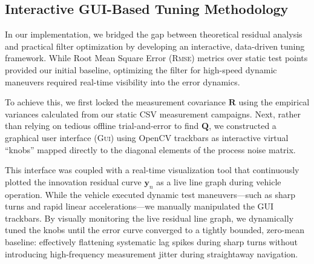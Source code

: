 \subsection{Interactive GUI-Based Tuning Methodology}

In our implementation, we bridged the gap between theoretical residual analysis and practical filter optimization by developing an interactive, data-driven tuning framework. While Root Mean Square Error (\textsc{Rmse}) metrics over static test points provided our initial baseline, optimizing the filter for high-speed dynamic maneuvers required real-time visibility into the error dynamics.

To achieve this, we first locked the measurement covariance $\mathbf{R}$ using the empirical variances calculated from our static CSV measurement campaigns. Next, rather than relying on tedious offline trial-and-error to find $\mathbf{Q}$, we constructed a graphical user interface (\textsc{Gui}) using OpenCV trackbars as interactive virtual \enquote{knobs} mapped directly to the diagonal elements of the process noise matrix.

This interface was coupled with a real-time visualization tool that continuously plotted the innovation residual curve $\mathbf{y}_n$ as a live line graph during vehicle operation.%
While the vehicle executed dynamic test maneuvers—such as sharp turns and rapid linear accelerations—we manually manipulated the GUI trackbars. By visually monitoring the live residual line graph, we dynamically tuned the knobs until the error curve converged to a tightly bounded, zero-mean baseline: effectively flattening systematic lag spikes during sharp turns without introducing high-frequency measurement jitter during straightaway navigation.
